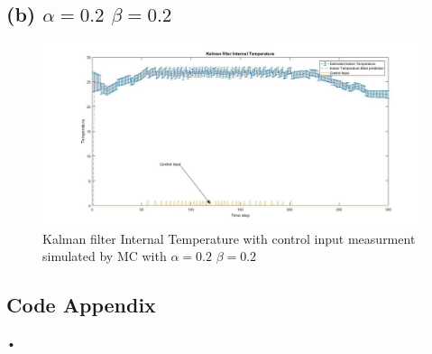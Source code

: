\documentclass[a4paper,11pt]{article}
\begin{document}
\subsection*{(b) $\alpha = 0.2$ $\beta = 0.2$}
\begin{figure}[h]
  \hspace*{-6cm}
   \includegraphics[scale=0.5]{q3_2}
   \caption{Kalman filter Internal Temperature with control input measurment simulated by MC with $\alpha = 0.2$ $\beta = 0.2$}\end{figure}
\newpage
\begin{appendix}
\section*{Code Appendix}
 
\end{appendix}•
\end{document}
